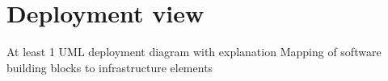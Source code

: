 \section{Deployment view}
At least 1 UML deployment diagram with explanation
Mapping of software building blocks to infrastructure elements